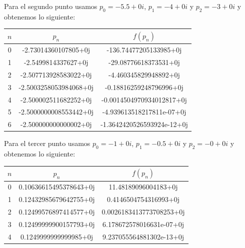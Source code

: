 \documentclass{article}
\begin{document}
Para el segundo punto usamos $p_0 = -5.5 + 0i$, $p_1 = -4+0i$ y $p_2 = -3+0i$ y obtenemos lo siguiente:
\begin{center}
    \begin{tabular}{||c c c||} 
    \hline
    $n$ & $p_{n}$ & $f(p_n)$ \\ [0.5ex] 
    \hline
    0 & -2.73014360107805+0j & -136.74477205133985+0j\\
    \hline
    1 & -2.5499814337627+0j & -29.08776618373531+0j \\
    \hline
    2 & -2.507713928583022+0j &-4.460345829948892+0j \\
    \hline
    3 & -2.5003258053984068+0j & -0.18816259248796996+0j \\ 
    \hline
    4 & -2.500002511682252+0j & -0.0014504970934012817+0j \\ 
    \hline
    5 & -2.5000000008553442+0j & -4.939613518217811e-07+0j \\ 
    \hline
    6 & -2.500000000000002+0j & -1.3642420526593924e-12+0j \\ [1ex]
    \hline

   \end{tabular}
\end{center}

Para el tercer punto usamos $p_0 = -1 + 0i$, $p_1 = -0.5 + 0i$ y $p_2 = -0 + 0i$ y obtenemos lo siguiente:
\begin{center}
    \begin{tabular}{||c c c||} 
    \hline
    $n$ & $p_{n}$ & $f(p_n)$ \\ [0.5ex] 
    \hline
    0 & 0.10636615495378643+0j & 11.48189096004183+0j\\
    \hline
    1 & 0.12432985679642755+0j & 0.4146504754316993+0j \\
    \hline
    2 & 0.12499576897414577+0j & 0.0026183413773708253+0j \\
    \hline
    3 & 0.12499999900157793+0j& 6.178672578016631e-07+0j \\ 
    \hline
    4 & 0.1249999999999985+0j & 9.237055564881302e-13+0j \\ [1ex]
    \hline

   \end{tabular}
\end{center}
\end{document}
